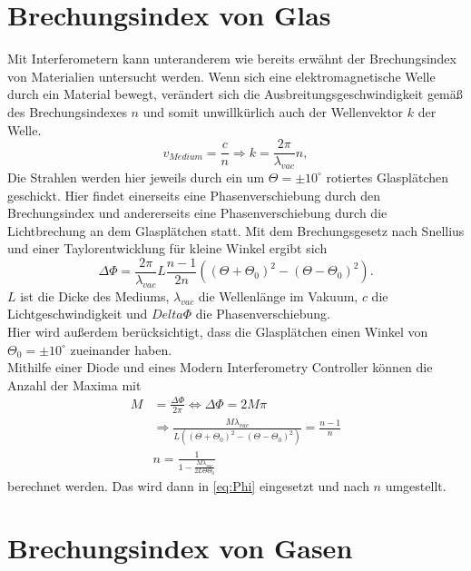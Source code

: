 \section{Brechungsindex von Glas}
\label{sec:BrechungGlas}
Mit Interferometern kann unteranderem wie bereits erwähnt der Brechungsindex von Materialien untersucht werden. Wenn sich eine elektromagnetische
Welle durch ein Material bewegt, verändert sich die Ausbreitungsgeschwindigkeit gemäß des Brechungsindexes $n$ und somit unwillkürlich auch der Wellenvektor $k$
der Welle.
\begin{equation}
    v_{Medium} = \frac{c}{n} \Rightarrow k = \frac{2\pi}{\lambda_{vac}}n,
\end{equation}
Die Strahlen werden hier jeweils durch ein um $\Theta = \pm 10^\circ$ rotiertes Glasplätchen geschickt. Hier findet einerseits eine Phasenverschiebung durch den Brechungsindex
und andererseits eine Phasenverschiebung durch die Lichtbrechung an dem Glasplätchen statt. Mit dem Brechungsgesetz nach Snellius und einer Taylorentwicklung für kleine
Winkel ergibt sich 
\begin{equation}
    \label{eq:Phi}
    \Delta \Phi = \frac{2\pi}{\lambda_{vac}}L\frac{n-1}{2n} \left((\Theta+\Theta_0)^2 - (\Theta-\Theta_0)^2 \right).
\end{equation}
$L$ ist die Dicke des Mediums, $\lambda_{vac}$ die Wellenlänge im Vakuum, $c$ die Lichtgeschwindigkeit und $Delta \Phi$ die Phasenverschiebung.\\
Hier wird außerdem berücksichtigt, dass die Glasplätchen einen Winkel von $\Theta_0 = \pm 10^\circ$ zueinander haben.\\
Mithilfe einer Diode und eines Modern Interferometry Controller \cite{v64} können die Anzahl der Maxima mit
\begin{align}
\label{eq:Maxima}
    M   &= \frac{\Delta\Phi}{2\pi} \Leftrightarrow \Delta\Phi = 2M\pi  \\
        &\Rightarrow  \frac{M\lambda_{vac}}{L \left((\Theta+\Theta_0)^2 - (\Theta-\Theta_0)^2 \right)} = \frac{n-1}{n} \\
        &n = \frac{1}{1- \frac{M \lambda_{vac}}{2 L \Theta \Theta_0}} 
\end{align}
berechnet werden. Das wird dann in \autoref{eq:Phi} eingesetzt und nach $n$ umgestellt.\\


\section{Brechungsindex von Gasen}
\label{sec:BrechungGas}

